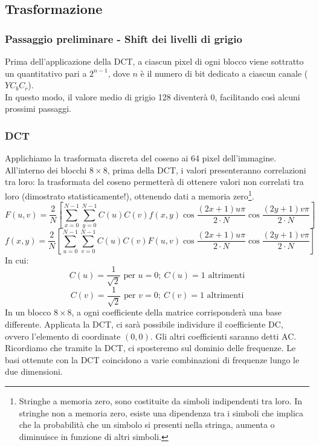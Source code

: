 \documentclass{report}
\begin{document}
	\subsection{Trasformazione}
	\subsubsection{Passaggio preliminare - Shift dei livelli di grigio}
	Prima dell'applicazione della DCT, a ciascun pixel di ogni blocco viene sottratto un quantitativo pari a $2^{n-1}$, dove $n$ è il numero di bit dedicato a ciascun canale ($YC_bC_r$).\\
	In questo modo, il valore medio di grigio 128 diventerà 0, facilitando così alcuni prossimi passaggi.
		
	\newpage
		
	\subsubsection{DCT}
	Applichiamo la trasformata discreta del coseno ai 64 pixel dell'immagine.\\
	All'interno dei blocchi $8\times 8$, prima della DCT, i valori presenteranno correlazioni tra loro: la trasformata del coseno permetterà di ottenere valori non correlati tra loro (dimostrato statisticamente!), ottenendo dati a memoria zero\footnote{Stringhe a memoria zero, sono costituite da simboli indipendenti tra loro.
	In stringhe non a memoria zero, esiste una dipendenza tra i simboli che implica che la probabilità che un simbolo si presenti nella stringa, aumenta o diminuisce in funzione di altri simboli.}.
	$$
	F(u,v) = \frac{2}{N}\left[\sum^{N-1}_{x=0}\sum^{N-1}_{y=0}C(u)C(v)f(x,y)\cos\frac{(2x+1)u\pi}{2\cdot N}\cos\frac{(2y+1)v\pi}{2\cdot N} \right]
	$$
	$$
	f(x,y) = \frac{2}{N}\left[\sum^{N-1}_{u=0}\sum^{N-1}_{v=0}C(u)C(v)F(u,v)\cos\frac{(2x+1)u\pi}{2\cdot N}\cos\frac{(2y+1)v\pi}{2\cdot N} \right]
	$$
	In cui:
	$$
	C(u) = \frac{1}{\sqrt{2}} \text{ per } u=0; \ C(u) = 1 \text{ altrimenti}
	$$
	$$
	C(v) = \frac{1}{\sqrt{2}} \text{ per } v=0; \ C(v) = 1 \text{ altrimenti}
	$$
	In un blocco $8 \times 8$, a ogni coefficiente della matrice corrisponderà una base differente.
	Applicata la DCT, ci sarà possibile individure il coefficiente DC, ovvero l'elemento di coordinate $(0,0)$. Gli altri coefficienti saranno detti AC.\\
	Ricordiamo che tramite la DCT, ci sposteremo sul dominio delle frequenze. Le basi ottenute con la DCT coincidono a varie combinazioni di frequenze lungo le due dimensioni.
\end{document}
